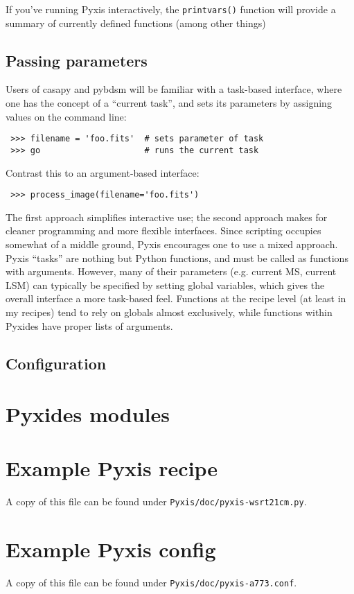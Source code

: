 \documentclass[a4paper,10pt]{article}
\begin{document}
If you've running Pyxis interactively, the {\tt printvars()} function will provide a summary of currently defined functions (among other things)


\subsection{Passing parameters}

Users of casapy and pybdsm will be familiar with a task-based interface, where one has the concept of a ``current task'', and sets its parameters by assigning values on the command line:

\begin{verbatim}
 >>> filename = 'foo.fits'  # sets parameter of task
 >>> go                     # runs the current task
\end{verbatim}

Contrast this to an argument-based interface:

\begin{verbatim}
 >>> process_image(filename='foo.fits')
\end{verbatim}

The first approach simplifies interactive use; the second approach makes for cleaner programming and more flexible interfaces. Since scripting occupies somewhat of a middle ground, Pyxis encourages one to use a mixed approach. Pyxis ``tasks'' are nothing but Python functions, and must be called as functions with arguments. However, many of their parameters (e.g. current MS, current LSM) can typically be specified by setting global variables, which gives the overall interface a more task-based feel. Functions at the recipe level (at least in my recipes) tend to rely on globals almost exclusively, while functions within Pyxides have proper lists of arguments. 


\subsection{Configuration}





\section{Pyxides modules}


\appendix\newpage

\section{Example Pyxis recipe}
\label{app:recipe}

A copy of this file can be found under {\tt Pyxis/doc/pyxis-wsrt21cm.py}.



\section{Example Pyxis config}
\label{app:config}

A copy of this file can be found under {\tt Pyxis/doc/pyxis-a773.conf}.


\end{document}
